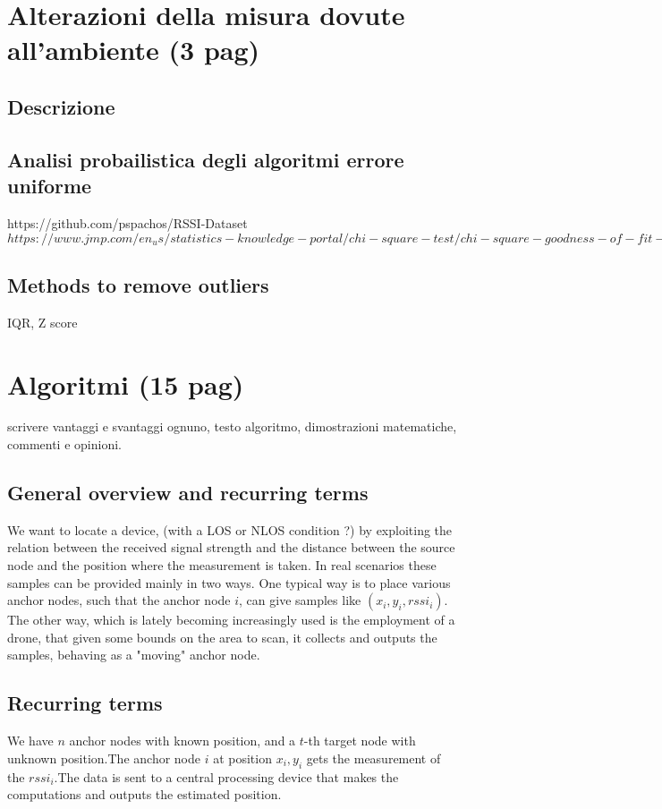 \documentclass[12pt]{report}
\begin{document}
\chapter{Alterazioni della misura dovute all'ambiente (3 pag)}
\section{Descrizione}
\section{Analisi probailistica degli algoritmi errore uniforme}
https://github.com/pspachos/RSSI-Dataset\\
$https://www.jmp.com/en_us/statistics-knowledge-portal/chi-square-test/chi-square-goodness-of-fit-test.html$
\section{Methods to remove outliers}
IQR, Z score

\clearpage



\chapter{Algoritmi (15 pag)}
scrivere vantaggi e svantaggi ognuno, testo algoritmo, dimostrazioni matematiche, commenti e opinioni.
\section{General overview and recurring terms}
We want to locate a device, (with a LOS or NLOS condition ?) by exploiting the relation between the received signal strength and the distance between the source node and the position where the measurement is taken. In real scenarios these samples can be provided mainly in two ways. One typical way is to place various anchor nodes, such that the anchor node $i$, can give samples like $(x_i,y_i,rssi_i)$. The other way, which is lately becoming increasingly used is the employment of a drone, that given some bounds on the area to scan, it collects and outputs the samples, behaving as a "moving" anchor node.
\section{Recurring terms}
We have $n$ anchor nodes with known position, and a $t$-th target node with unknown position.The anchor node $i$ at position $x_i,y_i$ gets the measurement of the $rssi_i$.The data is sent to a central processing device that makes the computations and outputs the estimated position. 
\clearpage
\end{document}
